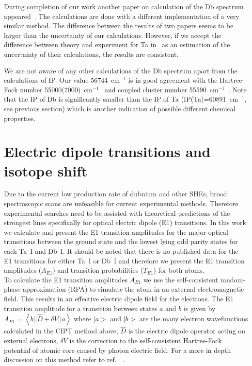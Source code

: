 \documentclass[8pt,a4paper, twoside]{report}
\begin{document}
During completion of our work another paper on calculation of the Db spectrum appeared~\cite{Geddes2018}.
The calculations are done with a different implementation of a very similar method. The difference between the results 
of two papers seems to be larger than the uncertainty of our calculations. However, if we accept the difference between 
theory and experiment for Ta in~\cite{Geddes2018} as an estimation of the uncertainty of their calculations, the results
are consistent.

We are not aware of any other calculations of the Db spectrum apart from the calculations of IP. Our value 56744~cm$^{-1}$ is in good agreement with the Hartree-Fock number 55000(7000)~cm$^{-1}$~\cite{Dzuba2016} and
coupled cluster number 55590~cm$^{-1}$~\cite{BorschevskyPC}. Note that the IP of Db is significantly smaller than the IP
of Ta (IP(Ta)=60891~cm$^{-1}$, see previous section) which is another indication of possible different chemical properties. 

\section{Electric dipole transitions and isotope shift} \label{sec:E1transitions}

Due to the current low production rate of dubnium and other SHEs, broad spectroscopic scans are unfeasible for current experimental methods. Therefore experimental searches need to be assisted with theoretical predictions of the strongest lines specifically for optical electric dipole (E1) transitions. In this work we calculate and present the E1 transition amplitudes for the major optical  transitions between the ground state and the  lowest lying odd parity states for each Ta~I and Db~I. It should be noted that there is no published data for the E1 transitions for either Ta~I or Db~I and therefore we present the E1 transition amplitudes ($A_{E1}$)  and transition probabilities ($T_{E1}$) for both atoms. \\

To calculate the E1 transition amplitudes $A_{E1}$ we use the self-consistent random-phase approximation (RPA) to simulate the atom in an external electromagnetic field. This results in an effective electric dipole field for the electrons. The E1 transition amplitude for a transition between states $a$ and $b$ is given by $A_{E1} = \left< b || \hat D + \delta V || a\right>$ where $|a>$ and $|b>$ are the many electron wavefunctions calculated in the CIPT method above, $\hat D$ is the electric dipole operator acting on external electrons, $\delta V$ is the correction to the self-consistent Hartree-Fock potential of atomic core caused by photon electric field. For a more in depth discussion on this method refer to ref. ~\cite{Dzuba2018}. \\
\end{document}
